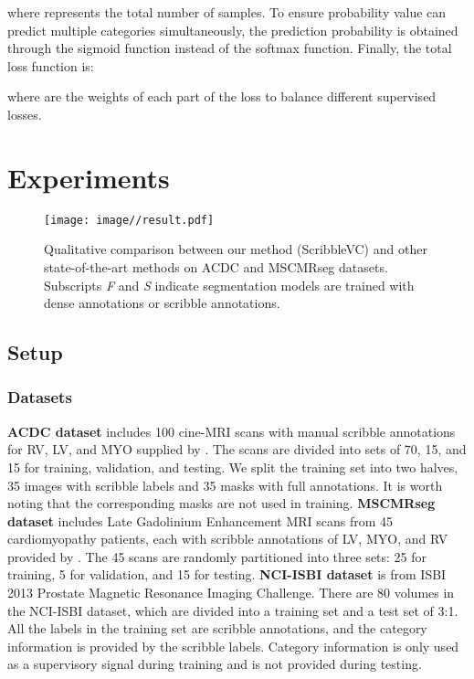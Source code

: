 \documentclass[sigconf,natbib=false]{acmart}
\begin{document}
where  represents the total number of samples. To ensure probability value can predict multiple categories simultaneously, the prediction probability  is obtained through the sigmoid function instead of the softmax function.
Finally, the total loss function is:

where  are the weights of each part of the loss to balance different supervised losses.


\section{Experiments}
\begin{figure*}[htbp]
\setlength{\abovecaptionskip}{0mm}
\centering 
\texttt{[image: image//result.pdf]}
\caption{Qualitative comparison between our method (ScribbleVC) and other state-of-the-art methods on ACDC and MSCMRseg datasets. Subscripts \textit{F} and \textit{S} indicate segmentation models are trained with dense annotations or scribble annotations.}
\label{results}
\vspace{-5mm}
\end{figure*}
\subsection{Setup}
\subsubsection{Datasets}
\textbf{ACDC dataset} \cite{acdc} includes 100 cine-MRI scans with manual scribble annotations for RV, LV, and MYO supplied by \cite{MAAG}. The scans are divided into sets of 70, 15, and 15 for training, validation, and testing. We split the training set into two halves, 35 images with scribble labels and 35 masks with full annotations. It is worth noting that the corresponding masks are not used in training. \textbf{MSCMRseg dataset} \cite{mscmr1, mscmr2} includes Late Gadolinium Enhancement MRI scans from 45 cardiomyopathy patients, each with scribble annotations of LV, MYO, and RV provided by \cite{Zhang_2022_CycleMix}. The 45 scans are randomly partitioned into three sets: 25 for training, 5 for validation, and 15 for testing. \textbf{NCI-ISBI dataset} \cite{Clark2013Cancer} is from ISBI 2013 Prostate Magnetic Resonance Imaging Challenge. There are 80 volumes in the NCI-ISBI dataset, which are divided into a training set and a test set of 3:1. All the labels in the training set are scribble annotations, and the category information is provided by the scribble labels. Category information is only used as a supervisory signal during training and is not provided during testing.
\end{document}
